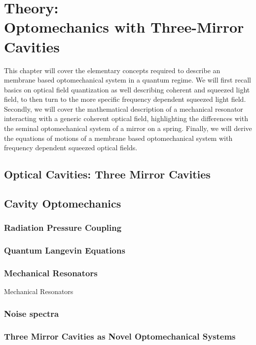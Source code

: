 \chapter{Theory: \\ Optomechanics with Three-Mirror Cavities}
This chapter will cover the elementary concepts required to describe an membrane based optomechanical system in a quantum regime. We will first recall basics on optical field quantization as well describing coherent and squeezed light field, to then turn to the more specific frequency dependent squeezed light field. Secondly, we will cover the mathematical description of a mechanical resonator interacting with a generic coherent optical field, highlighting the differences with the seminal optomechanical system of a mirror on a spring. Finally, we will derive the equations of motions of a membrane based optomechanical system with frequency dependent squeezed optical fields. 
\minitoc
\newpage



\section{Optical Cavities: Three Mirror Cavities}
\subsection{}

\section{Cavity Optomechanics}
\subsection{Radiation Pressure Coupling}
\subsection{Quantum Langevin Equations}
\subsection{Mechanical Resonators}{Mechanical Resonators}
\subsection{Noise spectra}
\subsection{Three Mirror Cavities as Novel Optomechanical Systems}
